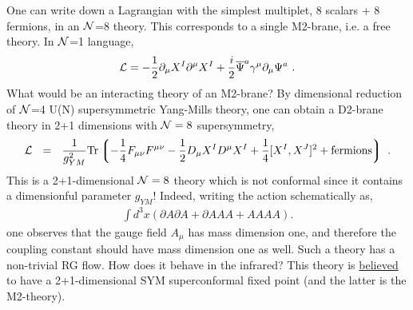 \documentclass[12pt]{article}
\def\be{\begin{eqnarray}}\def\ba{\begin{eqnarray}}
\def\ee{\end{eqnarray}}\def\ea{\end{eqnarray}}
\def\calL{{\cal L}}\def\calF{{\cal F}}
\def\calN{{\cal N}}
\begin{document}
%

One can write down a Lagrangian with the simplest multiplet, 8 scalars + 8 fermions, in an $\calN$=8 theory.
This corresponds to a single M2-brane, i.e. a free theory. 
In $\calN$=1 language, 
\be
\calL=-\frac{1}{2}\partial_\mu X^I \partial^\mu X^I + \frac{i}{2} \ov{\Psi}^a \gamma^\mu \partial_\mu \Psi^a~.
\ee
What would be an interacting theory of an M2-brane? 
By dimensional reduction of $\calN$=4 U(N) supersymmetric Yang-Mills theory, one can obtain a D2-brane theory in 2+1 dimensions with $\calN =8 $ supersymmetry,
\be \label{proto1}
\calL ~~=~~ \frac{1}{g_{YM}^2} \mathrm{Tr}\lgr-\frac{1}{4} F_{\mu\nu} F^{\mu\nu} - \frac{1}{2}D_\mu X^I D^\mu X^I + \frac{1}{4} [X^I, X^J]^2  + {\mathrm{fermions}}\rgr~.
\ee
This is a 2+1-dimensional $\calN=8$ theory which is not conformal since it contains a dimensionful parameter $g_{YM}$!
Indeed, writing the action schematically as,
\be
\int d^3 x \left(\partial A \partial A +\partial A A A + A A A A \right).
\ee
one observes that the gauge field $ A_\mu $ has mass dimension one, and therefore the coupling constant should have mass dimension one as well. 
Such a theory has a non-trivial RG flow.
How does it behave in the infrared?
This theory is \underline{believed} to have a 2+1-dimensional SYM superconformal fixed point (and the latter is the M2-theory).
\end{document}
